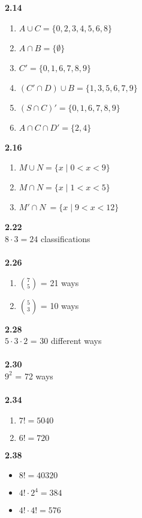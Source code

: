 \documentclass{article}
\begin{document}
    \textbf{2.14}
        \begin{enumerate}
            \item $A\cup C = \{0, 2, 3, 4, 5, 6, 8\}$
            \item $A\cap B = \{\emptyset\}$
            \item $C' = \{0, 1, 6, 7, 8, 9\}$
            \item $(C'\cap D)\cup B = \{1, 3, 5, 6, 7, 9\}$
            \item $(S\cap C)' = \{0, 1, 6, 7, 8, 9\}$
            \item $A\cap C \cap D' = \{2, 4\}$
        \end{enumerate}
    \textbf{2.16}
        \begin{enumerate}
            \item $M\cup N = \{x \mid 0 < x < 9\}$
            \item $M\cap N = \{x \mid 1 < x < 5\}$
            \item $M'\cap N\ = \{x \mid 9 < x < 12\}$
        \end{enumerate}
    \textbf{2.22}\\
        $8 \cdot 3 = 24$ classifications\\\\
    \textbf{2.26}
        \begin{enumerate}
           \item $\binom{7}{5}$ = 21 ways
           \item $\binom{5}{3}$ = 10 ways
        \end{enumerate}
    \textbf{2.28}\\
        $5 \cdot 3 \cdot 2$ = 30 different ways\\\\
    \textbf{2.30}\\
        $9^2$ = 72 ways\\\\
    \textbf{2.34}
        \begin{enumerate}
            \item $7! = 5040$
            \item $6! = 720$
        \end{enumerate}
    \textbf{2.38}
        \begin{itemize}
            \item $8! = 40320$
            \item $4!\cdot 2^4 = 384$
            \item $4!\cdot 4! = 576$
        \end{itemize}
\end{document}
